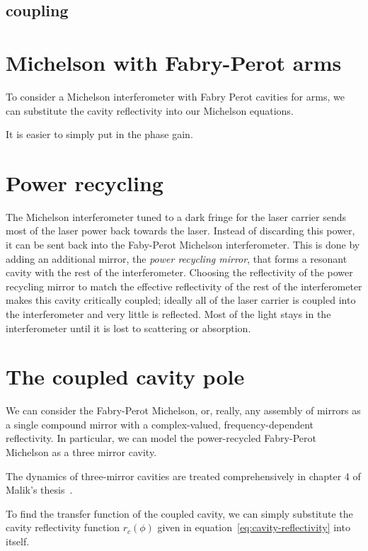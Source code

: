 \subsection{coupling}

\section{Michelson with Fabry-Perot arms}

To consider a Michelson interferometer with Fabry Perot cavities for
arms, we can substitute the cavity reflectivity into our Michelson
equations.

It is easier to simply put in the phase gain.

\section{Power recycling}

The Michelson interferometer tuned to a dark fringe for the laser
carrier sends most of the laser power back towards the laser.  Instead
of discarding this power, it can be sent back into the Faby-Perot
Michelson interferometer.  This is done by adding an additional
mirror, the \emph{power recycling mirror}, that forms a resonant
cavity with the rest of the interferometer.  Choosing the reflectivity
of the power recycling mirror to match the effective reflectivity of
the rest of the interferometer makes this cavity critically coupled;
ideally all of the laser carrier is coupled into the interferometer
and very little is reflected.  Most of the light stays in the
interferometer until it is lost to scattering or absorption.

\section{The coupled cavity pole}

We can consider the Fabry-Perot Michelson, or, really, any assembly of
mirrors as a single compound mirror with a complex-valued,
frequency-dependent reflectivity.  In particular, we can model the
power-recycled Fabry-Perot Michelson as a three mirror cavity.

The dynamics of three-mirror cavities are treated comprehensively in
chapter 4 of Malik's thesis~\cite{Rakhmanov2000Dynamics}.

To find the transfer function of the coupled cavity, we can simply
substitute the cavity reflectivity function $r_c(\phi)$ given in
equation~\ref{eq:cavity-reflectivity} into itself.  

